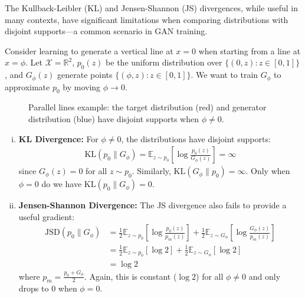 The Kullback-Leibler (KL) and Jensen-Shannon (JS) divergences, while useful in many contexts, have significant limitations when comparing distributions with disjoint supports—a common scenario in GAN training.

\begin{example}
  \label{example:learning-parallel-lines}
  Consider learning to generate a vertical line at $x=0$ when starting from a line at $x=\phi$. Let $\mathcal{X} = \mathbb{R}^2$, $p_0(z)$ be the uniform distribution over $\{(0, z) : z \in [0, 1]\}$, and $G_\phi(z)$ generate points $\{(\phi, z) : z \in [0, 1]\}$. We want to train $G_\phi$ to approximate $p_0$ by moving $\phi \to 0$.
  
  \begin{figure}[h]
    \centering
    \caption{Parallel lines example: the target distribution (red) and generator distribution (blue) have disjoint supports when $\phi \neq 0$.}%
    \label{fig:parallel-lines}
  \end{figure}
  
  \begin{enumerate}[(i)]
    \item \textbf{KL Divergence:} For $\phi \neq 0$, the distributions have disjoint supports:
    \begin{align}
      \text{KL}(p_0 \| G_\phi) = \mathbb{E}_{z \sim p_0} \left[ \log \frac{p_0(z)}{G_\phi(z)} \right] = \infty
    \end{align}
    since $G_\phi(z) = 0$ for all $z \sim p_0$. Similarly, $\text{KL}(G_\phi \| p_0) = \infty$. Only when $\phi = 0$ do we have $\text{KL}(p_0 \| G_\phi) = 0$.
    
    \item \textbf{Jensen-Shannon Divergence:} The JS divergence also fails to provide a useful gradient:
    \begin{align}
      \text{JSD}(p_0 \| G_\phi) &= \frac{1}{2} \mathbb{E}_{z \sim p_0} \left[ \log \frac{p_0(z)}{p_m(z)} \right] + \frac{1}{2} \mathbb{E}_{z \sim G_\phi} \left[ \log \frac{G_\phi(z)}{p_m(z)} \right] \\
      &= \frac{1}{2} \mathbb{E}_{z \sim p_0} [\log 2] + \frac{1}{2} \mathbb{E}_{z \sim G_\phi} [\log 2] \\
      &= \log 2
    \end{align}
    where $p_m = \frac{p_0 + G_\phi}{2}$. Again, this is constant ($\log 2$) for all $\phi \neq 0$ and only drops to 0 when $\phi = 0$.
  \end{enumerate}
\end{example}

